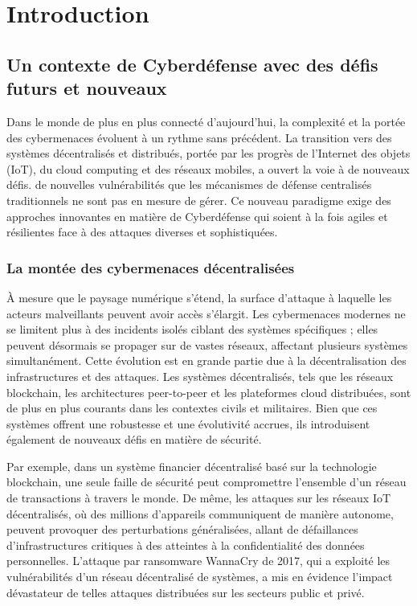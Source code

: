 \chapter{Introduction}\label{ch:introduction}

\section{Un contexte de Cyberdéfense avec des défis futurs et nouveaux}

Dans le monde de plus en plus connecté d'aujourd'hui, la complexité et la portée des cybermenaces évoluent à un rythme sans précédent. La transition vers des systèmes décentralisés et distribués, portée par les progrès de l'Internet des objets (IoT), du cloud computing et des réseaux mobiles, a ouvert la voie à de nouveaux défis. de nouvelles vulnérabilités que les mécanismes de défense centralisés traditionnels ne sont pas en mesure de gérer\cite{sun2014data}. Ce nouveau paradigme exige des approches innovantes en matière de Cyberdéfense qui soient à la fois agiles et résilientes face à des attaques diverses et sophistiquées\cite{taddeo2019trusting}.

\subsection{La montée des cybermenaces décentralisées}

À mesure que le paysage numérique s'étend, la surface d'attaque à laquelle les acteurs malveillants peuvent avoir accès s'élargit. Les cybermenaces modernes ne se limitent plus à des incidents isolés ciblant des systèmes spécifiques ; elles peuvent désormais se propager sur de vastes réseaux, affectant plusieurs systèmes simultanément. Cette évolution est en grande partie due à la décentralisation des infrastructures et des attaques. Les systèmes décentralisés, tels que les réseaux blockchain, les architectures peer-to-peer et les plateformes cloud distribuées, sont de plus en plus courants dans les contextes civils et militaires. Bien que ces systèmes offrent une robustesse et une évolutivité accrues, ils introduisent également de nouveaux défis en matière de sécurité.

Par exemple, dans un système financier décentralisé basé sur la technologie blockchain, une seule faille de sécurité peut compromettre l'ensemble d'un réseau de transactions à travers le monde\cite{li2020survey}. De même, les attaques sur les réseaux IoT décentralisés, où des millions d'appareils communiquent de manière autonome, peuvent provoquer des perturbations généralisées, allant de défaillances d'infrastructures critiques à des atteintes à la confidentialité des données personnelles\cite{sun2014data}. L'attaque par ransomware WannaCry de 2017, qui a exploité les vulnérabilités d'un réseau décentralisé de systèmes, a mis en évidence l'impact dévastateur de telles attaques distribuées sur les secteurs public et privé\cite{mohurle2017wannacry}.


